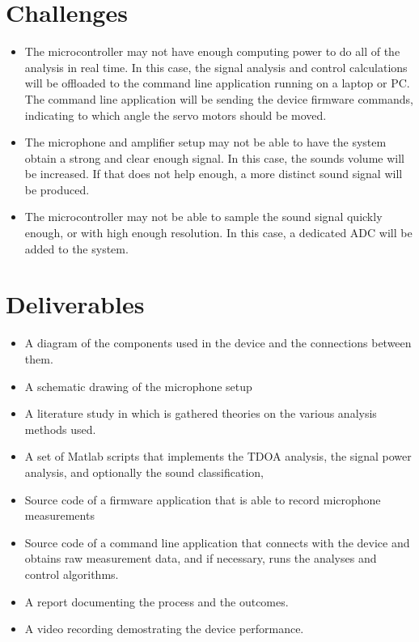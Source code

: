 \documentclass[a4paper]{article}
\begin{document}
\section{Challenges}
\begin{itemize}
    \item The microcontroller may not have enough computing power to do all of the analysis in real time. In this case, the signal analysis and control calculations will be offloaded to the command line application running on a laptop or PC. The command line application will be sending the device firmware commands, indicating to which angle the servo motors should be moved.
    \item The microphone and amplifier setup may not be able to have the system obtain a strong and clear enough signal. In this case, the sounds volume will be increased. If that does not help enough, a more distinct sound signal will be produced.
    \item The microcontroller may not be able to sample the sound signal quickly enough, or with high enough resolution. In this case, a dedicated ADC will be added to the system.

\end{itemize}
\section{Deliverables}
\begin{itemize}
    \item A diagram of the components used in the device and the connections between them.
    \item A schematic drawing of the microphone setup
    \item A literature study in which is gathered theories on the various analysis methods used.
    \item A set of Matlab scripts that implements the TDOA analysis, the signal power analysis, and optionally the sound classification,
    \item Source code of a firmware application that is able to record microphone measurements
    \item Source code of a command line application that connects with the device and obtains raw measurement data, and if necessary, runs the analyses and control algorithms.
    \item A report documenting the process and the outcomes.
    \item A video recording demostrating the device performance.
\end{itemize}



\end{document}
